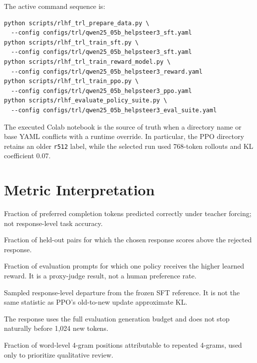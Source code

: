 \documentclass[11pt]{article}
\begin{document}
The active command sequence is:

\begin{verbatim}
python scripts/rlhf_trl_prepare_data.py \
  --config configs/trl/qwen25_05b_helpsteer3_sft.yaml
python scripts/rlhf_trl_train_sft.py \
  --config configs/trl/qwen25_05b_helpsteer3_sft.yaml
python scripts/rlhf_trl_train_reward_model.py \
  --config configs/trl/qwen25_05b_helpsteer3_reward.yaml
python scripts/rlhf_trl_train_ppo.py \
  --config configs/trl/qwen25_05b_helpsteer3_ppo.yaml
python scripts/rlhf_evaluate_policy_suite.py \
  --config configs/trl/qwen25_05b_helpsteer3_eval_suite.yaml
\end{verbatim}

The executed Colab notebook is the source of truth when a directory name or
base YAML conflicts with a runtime override. In particular, the PPO directory
retains an older \texttt{r512} label, while the selected run used 768-token
rollouts and KL coefficient 0.07.

\section{Metric Interpretation}

\begin{description}[style=nextline]
  \item[SFT mean token accuracy]
  Fraction of preferred completion tokens predicted correctly under teacher
  forcing; not response-level task accuracy.

  \item[Reward-model pairwise accuracy]
  Fraction of held-out pairs for which the chosen response scores above the
  rejected response.

  \item[Policy win rate]
  Fraction of evaluation prompts for which one policy receives the higher
  learned reward. It is a proxy-judge result, not a human preference rate.

  \item[Objective KL]
  Sampled response-level departure from the frozen SFT reference. It is not the
  same statistic as PPO's old-to-new update approximate KL.

  \item[Cap hit]
  The response uses the full evaluation generation budget and does not stop
  naturally before 1,024 new tokens.

  \item[Repeated 4-gram fraction]
  Fraction of word-level 4-gram positions attributable to repeated 4-grams,
  used only to prioritize qualitative review.
\end{description}
\end{document}
